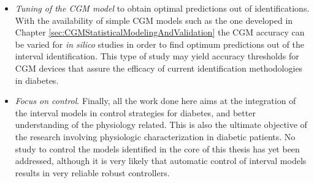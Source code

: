\begin{itemize}
	\item \textit{Tuning of the CGM model} to obtain optimal predictions out of identifications. With the availability of simple CGM models such as the one developed in Chapter \ref{sec:CGMStatisticalModelingAndValidation} the CGM accuracy can be varied for \textit{in silico} studies in order to find optimum predictions out of the interval identification. This type of study may yield accuracy thresholds for CGM devices that assure the efficacy of current identification methodologies in diabetes.
	\item \textit{Focus on control}. Finally, all the work done here aims at the integration of the interval models in control strategies for diabetes, and better understanding of the physiology related. This is also the ultimate objective of the research involving physiologic characterization in diabetic patients. No study to control the models identified in the core of this thesis has yet been addressed, although it is very likely that automatic control of interval models results in very reliable robust controllers.
\end{itemize}